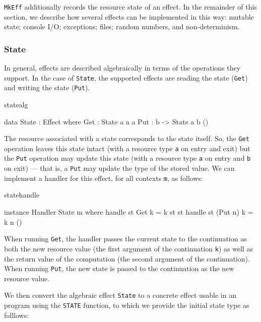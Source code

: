 \noindent
\texttt{MkEff} additionally records the resource state of an effect.
In the remainder of this section, we describe how several effects can be
implemented in this way: mutable state; console I/O; exceptions; files; random
numbers, and non-determinism.

\subsubsection{State}

In general, effects are described algebraically in terms of the operations
they support. In the case of \texttt{State}, the supported effects are reading
the state (\texttt{Get}) and writing the state (\texttt{Put}).

\begin{SaveVerbatim}{statealg}

data State : Effect where
     Get :      State a a a
     Put : b -> State a b ()

\end{SaveVerbatim}

\noindent
The resource associated with a state corresponds to the state itself. So,
the \texttt{Get} operation leaves this state intact (with a resource type
\texttt{a} on entry and exit) but the \texttt{Put} operation may update this
state (with a resource type \texttt{a} on entry and \texttt{b} on exit)
--- that is, a \texttt{Put} may update the type of the stored value.
We can implement a handler for this effect, for all contexts \texttt{m},
as follows:

\begin{SaveVerbatim}{statehandle}

instance Handler State m where
     handle st Get     k = k st st
     handle st (Put n) k = k n ()

\end{SaveVerbatim}

\noindent
When running \texttt{Get}, the handler passes the current state to the
continuation as both the new resource value (the first argument of the
continuation \texttt{k}) as well as the return value of the computation (the
second argument of the continuation). When running \texttt{Put}, the new state
is passed to the continuation as the new resource value.

We then convert the algebraic effect \texttt{State} to a concrete
effect usable in an \Eff{} program using the \texttt{STATE} function, to which
we provide the initial state type as folllows:

